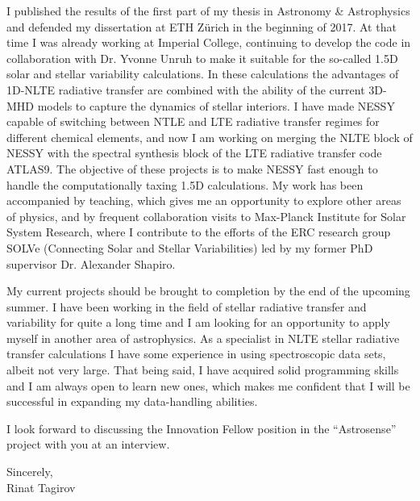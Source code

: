 \documentclass[11pt, a4paper]{awesome-cv}
\begin{document}
\begin{cvletter}
I published the results of the first part of my thesis in Astronomy \& Astrophysics 
and defended my dissertation at ETH Z{\"u}rich in the beginning of 2017.
At that time I was already working at Imperial College, continuing to develop
the code in collaboration with Dr. Yvonne Unruh to make it suitable
for the so-called 1.5D solar and stellar variability calculations. 
In these calculations the advantages of 1D-NLTE radiative transfer are
combined with the ability of the current 3D-MHD models to capture the dynamics of stellar interiors.
I have made NESSY capable of switching between NTLE and LTE radiative transfer regimes for different chemical elements,
and now I am working on merging the NLTE block of NESSY with the spectral synthesis block of the LTE radiative transfer code ATLAS9.
The objective of these projects is to make NESSY fast enough to handle the computationally taxing 1.5D calculations.
My work has been accompanied by teaching, which gives me an opportunity to explore other areas of physics,
and by frequent collaboration visits to Max-Planck Institute for Solar System Research,
where I contribute to the efforts of the ERC research group SOLVe (Connecting Solar and Stellar Variabilities)
led by my former PhD supervisor Dr. Alexander Shapiro.

My current projects should be brought to completion by the end of the upcoming summer.
I have been working in the field of stellar radiative transfer and variability for quite a long time and I am looking
for an opportunity to apply myself in another area of astrophysics.
As a specialist in NLTE stellar radiative transfer calculations I have some experience in using spectroscopic data sets, albeit not very large.
That being said, I have acquired solid programming skills and I am always open to learn new ones, which makes me confident that
I will be successful in expanding my data-handling abilities.

I look forward to discussing the Innovation Fellow position in the ``Astrosense'' project with you at an interview.

Sincerely,\\
Rinat Tagirov

\end{cvletter}


\end{document}

